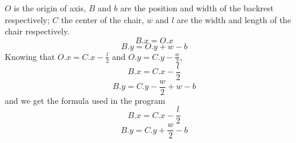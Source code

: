 \documentclass{article}
\begin{document}
\begin{figure}[H]
    \centering
    
\end{figure}

$O$ is the origin of axis, $B$ and $b$ are the position and width of the backrest respectively; $C$ the center of the chair, $w$ and $l$ are the width and length of the chair respectively.
$$B.x = O.x$$
$$B.y = O.y + w - b$$
Knowing that $O.x = C.x - \frac{l}{2}$ and $O.y = C.y - \frac{w}{2}$,
$$B.x = C.x - \frac{l}{2}$$
$$B.y = C.y - \frac{w}{2} + w - b$$
and we get the formula used in the program
$$B.x = C.x - \frac{l}{2}$$
$$B.y = C.y + \frac{w}{2} - b$$
\end{document}
